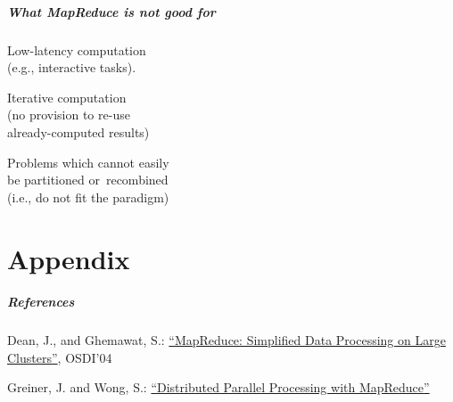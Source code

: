 \documentclass[english,serif,mathserif]{beamer}
\begin{document}
\begin{frame}
  \frametitle{What MapReduce is {\em not} good for}

  Low-latency computation \\ (e.g., interactive tasks).
  \\

  \+
  \begin{flushright}
    Iterative computation \\ (no provision to re-use \\ already-computed
    results)
  \end{flushright}

  \+
  Problems which cannot easily \\ be partitioned or~recombined \\ (i.e., do
  not fit the paradigm)
\end{frame}


\part{Appendix}
\begin{frame}
  \frametitle{References}

  Dean, J., and Ghemawat, S.:
  \href{http://research.google.com/archive/mapreduce.html}{``MapReduce: Simplified Data Processing on Large Clusters''},
  OSDI'04

  \+
  Greiner, J. and Wong, S.:
  \href{http://www.clear.rice.edu/comp130/12spring/MapReduce/}{``Distributed Parallel Processing with MapReduce''}

\end{frame}
\end{document}
